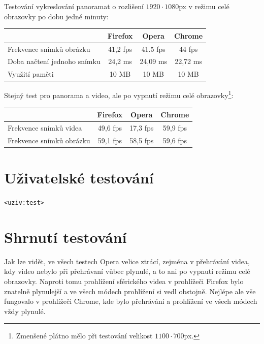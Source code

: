 Testování vykreslování panoramat o rozlišení $1920 \cdot 1080$px v režimu celé obrazovky po dobu jedné minuty:

\begin{center}
	\begin{tabular}{ l | c| c| c  } 
		& \textbf{Firefox} & \textbf{Opera}  & \textbf{Chrome}   \\ 
		\hline
		Frekvence snímků obrázku & 41,2 fps & 41.5 fps & 44 fps    \\ 
		\hline
		Doba načtení jednoho snímku  & 24,2 ms & 24,09 ms & 22,72 ms  \\ 
		\hline
		Využití paměti & 10  MB & 10  MB & 10  MB   \\ 
		
	\end{tabular}
\end{center}

\newpage

Stejný test pro panorama a video, ale po vypnutí režimu celé obrazovky\footnote{Zmenšené plátno mělo při testování velikost $1100 \cdot 700$px.}:

\begin{center}
	\begin{tabular}{ l | c| c| c  } 
		& \textbf{Firefox} & \textbf{Opera}  & \textbf{Chrome}   \\ 
		\hline
		Frekvence snímků videa & 49,6 fps & 17,3 fps & 59,9 fps    \\ 
		\hline
		Frekvence snímků obrázku & 59,1 fps & 58,5 fps & 59,6 fps    \\ 
		
	\end{tabular}
\end{center}

\section*{Uživatelské testování}
\texttt{<uziv:test>}

\section*{Shrnutí testování}
Jak lze vidět, ve všech testech Opera velice ztrácí, zejména v přehrávání videa, kdy video nebylo při přehrávaní vůbec plynulé, a to ani po vypnutí režimu celé obrazovky. Naproti tomu prohlížení sférického videa v prohlížeči Firefox bylo znatelně plynulejší a ve všech módech prohlížení si vedl obstojně. Nejlépe ale vše fungovalo v prohlížeči Chrome, kde bylo přehrávání a prohlížení ve všech módech vždy plynulé. 

